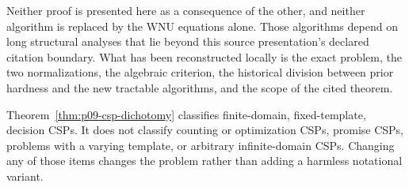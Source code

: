 Neither proof is presented here as a consequence of the other, and neither
algorithm is replaced by the WNU equations alone.  Those algorithms depend on
long structural analyses that lie beyond this source presentation's declared
citation boundary.  What has been reconstructed locally is the exact problem,
the two normalizations, the algebraic criterion, the historical division
between prior hardness and the new tractable algorithms, and the scope of the
cited theorem.

Theorem~\ref{thm:p09-csp-dichotomy} classifies finite-domain,
fixed-template, decision CSPs.  It does not classify counting or optimization
CSPs, promise CSPs, problems with a varying template, or arbitrary
infinite-domain CSPs.  Changing any of those items changes the problem rather
than adding a harmless notational variant.
